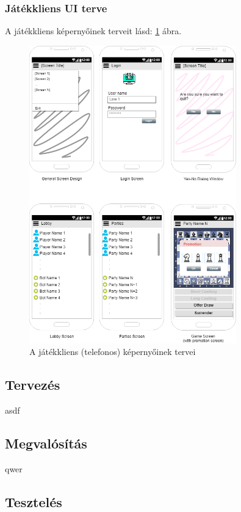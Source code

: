 \documentclass[twoside, a4paper, 12pt]{article}
\begin{document}
\subsubsection{Játékkliens UI terve}
A játékkliens képernyőinek terveit lásd: \ref{fig:gameClientScreens} ábra.
\begin{figure}[htbp]
	\centering
	\includegraphics[width=0.8\textwidth]{img/gameClientScreens.png}
	\caption{A játékkliens (telefonos) képernyőinek tervei}
	\label{fig:gameClientScreens}
\end{figure}

\subsection{Tervezés}
asdf

\subsection{Megvalósítás}
qwer

\subsection{Tesztelés}
\end{document}
